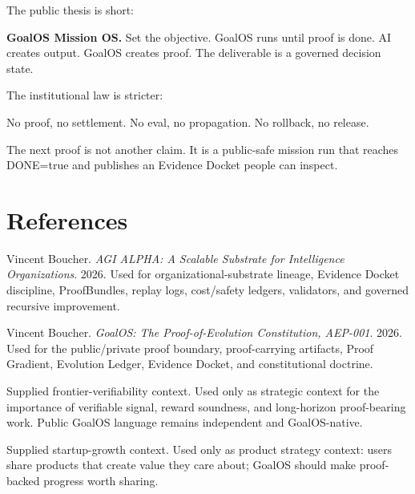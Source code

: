 \documentclass[11pt]{article}
\begin{document}
The public thesis is short:
\begin{goldbox}
\textbf{GoalOS Mission OS.} Set the objective. GoalOS runs until proof is done. AI creates output. GoalOS creates proof. The deliverable is a governed decision state.
\end{goldbox}

The institutional law is stricter:
\begin{mintbox}
No proof, no settlement. No eval, no propagation. No rollback, no release.
\end{mintbox}

The next proof is not another claim. It is a public-safe mission run that reaches DONE=true and publishes an Evidence Docket people can inspect.

\section*{References}
\begin{enumerate}[label={[\arabic*]}, leftmargin=1.8em]
\item Vincent Boucher. \emph{AGI ALPHA: A Scalable Substrate for Intelligence Organizations}. 2026. Used for organizational-substrate lineage, Evidence Docket discipline, ProofBundles, replay logs, cost/safety ledgers, validators, and governed recursive improvement.
\item Vincent Boucher. \emph{GoalOS: The Proof-of-Evolution Constitution, AEP-001}. 2026. Used for the public/private proof boundary, proof-carrying artifacts, Proof Gradient, Evolution Ledger, Evidence Docket, and constitutional doctrine.
\item Supplied frontier-verifiability context. Used only as strategic context for the importance of verifiable signal, reward soundness, and long-horizon proof-bearing work. Public GoalOS language remains independent and GoalOS-native.
\item Supplied startup-growth context. Used only as product strategy context: users share products that create value they care about; GoalOS should make proof-backed progress worth sharing.
\end{enumerate}
\end{document}
